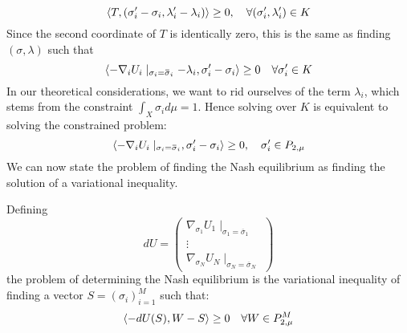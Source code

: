 \begin{equation}
  \left \langle T,(\sigma_i' -\sigma_i,\lambda_i'-\lambda_i) \right \rangle \geq 0, \quad \forall (\sigma_i', \lambda_i') \in K
\end{equation}
Since the second coordinate of $T$ is identically zero, this is the same as finding $(\sigma,\lambda)$ such that
\begin{equation}
  \label{eq:simp_var_eq}
  \ip{-\nabla_i U_i \mid_{\sigma_i = \overbar{\sigma}_i} - \lambda_i}{\sigma_i' -\sigma_i} \geq 0 \quad \forall \sigma_i' \in K
\end{equation}
In our theoretical considerations, we want to rid ourselves of the term $\lambda_i$, which stems from the constraint $\int_X \sigma_i d\mu = 1$. Hence solving  over $K$ is equivalent to solving the constrained problem:
\begin{equation}
  \ip{-\nabla_i U_i \mid_{\sigma_i = \overbar{\sigma}_i}}{\sigma_i' -\sigma_i} \geq 0, \quad \sigma_i' \in P_{2,\mu}
\end{equation}
We can now state the problem of finding the Nash equilibrium  as finding the solution of a variational inequality.
\begin{definition}
  \label{def:var_eq_nash}
  Defining
\begin{equation}
  dU = \begin{pmatrix} \nabla_{\sigma_1} U_1 \mid_{\sigma_1 = \overbar{\sigma}_1}\\
      \vdots \\
      \nabla_{\sigma_N} U_N \mid_{\sigma_N = \overbar{\sigma}_N} \end{pmatrix}
\end{equation}
the problem of determining the Nash equilibrium  is the variational inequality of finding a vector $S = (\sigma_i)_{i=1}^M$ such that:
\begin{equation}
  \left \langle -dU(S),W-S \right \rangle \geq 0 \quad \forall W\in P_{2,\mu}^M
\end{equation}
\end{definition}


